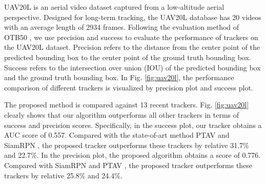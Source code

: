UAV20L \cite{mueller2016benchmark} is an aerial video dataset captured from a low-altitude aerial perspective. Designed for long-term tracking, the UAV20L database has 20 videos with an average length of 2934 frames. 
Following the evaluation method of OTB50 \cite{OTB}, we use precision and success to evaluate the performance of  trackers on the UAV20L dataset. Precision refers to the distance from the center point of the predicted bounding box to the center point of the ground truth bounding box. Success refers to the intersection over union (IOU) of the predicted bounding box and the ground truth bounding box. In Fig. \ref{fig:uav20l}, the performance comparison of different trackers is visualized by precision plot and success plot.

The proposed method is compared against 13 recent trackers. Fig. \ref{fig:uav20l} clearly shows that our algorithm outperforms all other trackers in terms of success and precision scores. Specifically, in the success plot, our tracker obtains a AUC score of 0.557. Compared with the state-of-art method PTAV \cite{fan2018parallel} and SiamRPN \cite{SiamRPN}, the proposed tracker outperforms these trackers by relative 31.7\% and 22.7\%. In the precision plot, the proposed algorithm obtains a score of 0.776. Compared with SiamRPN \cite{SiamRPN} and PTAV \cite{fan2018parallel}, the proposed tracker outperforms these trackers by relative 25.8\% and 24.4\%. 

